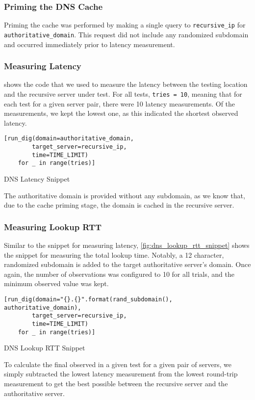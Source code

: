 \subsubsection{Priming the DNS Cache}

Priming the \dns cache was performed by making a single \dns query to \texttt{recursive\_ip} for \texttt{authoritative\_domain}. This request did not include any randomized subdomain and occurred immediately prior to latency measurement.

\subsubsection{Measuring Latency}

 shows the code that we used to measure the latency between the testing location and the recursive \dns server under test. For all tests, \texttt{tries = 10}, meaning that for each test for a given server pair, there were 10 latency measurements. Of the measurements, we kept the lowest one, as this indicated the shortest observed latency.

\begin{code}[H]
\centering
    \begin{verbatim}
[run_dig(domain=authoritative_domain, 
        target_server=recursive_ip, 
        time=TIME_LIMIT) 
    for _ in range(tries)]
    \end{verbatim}
    \caption{DNS Latency Snippet}
    \label{fig:dns_latency_snippet}
\end{code}

The authoritative domain is provided without any subdomain, as we know that, due to the cache priming stage, the domain is cached in the recursive server.

\subsubsection{Measuring Lookup RTT}

Similar to the snippet for measuring latency, \cref{fig:dns_lookup_rtt_snippet} shows the snippet for measuring the total lookup time. Notably, a 12 character, randomized subdomain is added to the target authoritative server's domain. Once again, the number of observations was configured to 10 for all trials, and the minimum observed value was kept.

\begin{code}[H]
\centering
    \begin{verbatim}
[run_dig(domain="{}.{}".format(rand_subdomain(), authoritative_domain),
        target_server=recursive_ip, 
        time=TIME_LIMIT) 
    for _ in range(tries)]
    \end{verbatim}
    \caption{DNS Lookup RTT Snippet}
    \label{fig:dns_lookup_rtt_snippet}
\end{code}

To calculate the final \rtt observed in a given test for a given pair of servers, we simply subtracted the lowest latency measurement from the lowest round-trip measurement to get the best possible \rtt between the recursive \dns server and the authoritative \dns server.